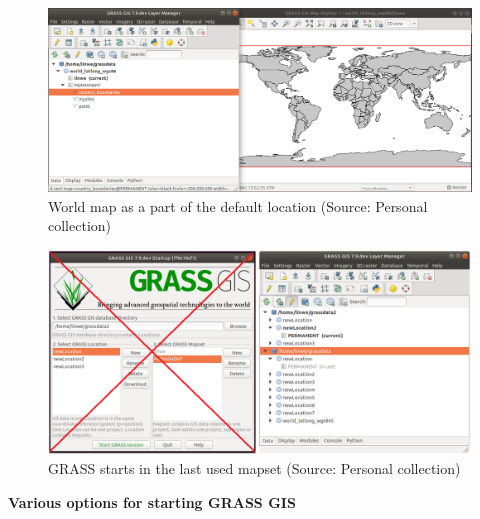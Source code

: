\documentclass[a4paper,10pt,twoside]{article}
\begin{document}
\begin{enumerate}
\newpage
\vspace{0.3cm}
\begin{figure}[hbt!] 
\begin{center}
\includegraphics[width=16.5cm]{../pictures/demolocation.png} 
\caption[World map as a part of the default location]{World map as a part of the default location (Source: Personal collection)}
\label{fig:demolocation}
\end{center}
\end{figure}

\vspace{0.3cm}
\begin{figure}[hbt!] 
\begin{center}
\includegraphics[width=16.5cm]{../pictures/last_mapset_startup.png} 
\caption[GRASS starts in the last used mapset]{GRASS starts in the last used mapset (Source: Personal collection)}
\label{fig:last_mapset_startup}
\end{center}
\end{figure}

\end{enumerate}

\bigskip
\noindent \textbf {Various options for starting GRASS GIS}
\end{document}
